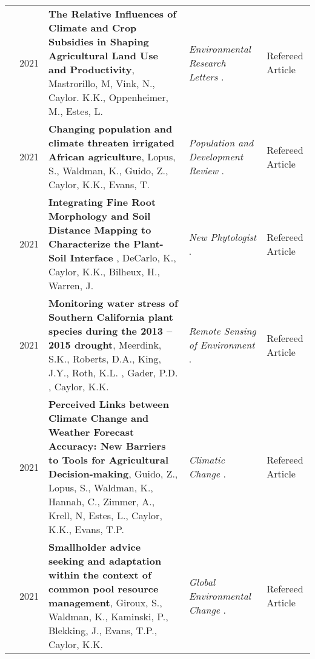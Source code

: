 \begin{longtable}{lcp{7.75cm}>{\raggedright}p{5.25cm}p{1.75cm}}
     & 2021 & {\bf The Relative Influences of Climate and Crop Subsidies in Shaping Agricultural Land Use and Productivity}, Mastrorillo, M, Vink, N., Caylor. K.K., Oppenheimer, M., Estes, L.  & \emph{ Environmental Research Letters } .   & Refereed Article\\
     & 2021 & {\bf Changing population and climate threaten irrigated African agriculture}, Lopus, S., Waldman, K., Guido, Z., Caylor, K.K., Evans, T.  & \emph{ Population and Development Review } .   & Refereed Article\\
     & 2021 & {\bf Integrating Fine Root Morphology and Soil Distance Mapping to Characterize the Plant-Soil Interface }, DeCarlo, K., Caylor, K.K., Bilheux, H., Warren, J.  & \emph{ New Phytologist } .   & Refereed Article\\
     & 2021 & {\bf Monitoring water stress of Southern California plant species during the 2013 – 2015 drought}, Meerdink, S.K., Roberts, D.A., King, J.Y., Roth, K.L. , Gader, P.D. , Caylor, K.K.  & \emph{ Remote Sensing of Environment } .   & Refereed Article\\
     & 2021 & {\bf Perceived Links between Climate Change and Weather Forecast Accuracy: New Barriers to Tools for Agricultural Decision-making}, Guido, Z., Lopus, S., Waldman, K., Hannah, C., Zimmer, A., Krell, N, Estes, L., Caylor, K.K., Evans, T.P.  & \emph{ Climatic Change } .   & Refereed Article\\
     & 2021 & {\bf Smallholder advice seeking and adaptation within the context of common pool resource management}, Giroux, S., Waldman, K., Kaminski, P., Blekking, J., Evans, T.P., Caylor, K.K.  & \emph{ Global Environmental Change } .   & Refereed Article\\
\end{longtable}
